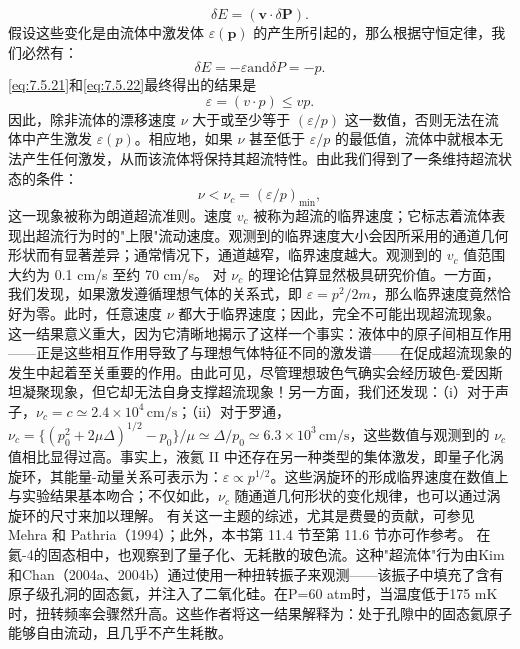 \begin{equation}\tag{7.5.37}\label{eq:7.5.37}
\delta E = ( \pmb { v } \cdot \delta \mathbf { P } ) .
\end{equation}
假设这些变化是由流体中激发体 \(\varepsilon(\boldsymbol{p})\) 的产生所引起的，那么根据守恒定律，我们必然有：
\begin{equation}\tag{7.5.38}\label{eq:7.5.38}
\delta E = - \varepsilon  \mathrm { a n d }  \delta P = - p .
\end{equation}
\autoref{eq:7.5.21}和\autoref{eq:7.5.22}最终得出的结果是
\begin{equation}\tag{7.5.39}\label{eq:7.5.39}
\varepsilon = ( v \cdot p ) \leq v p .
\end{equation}
因此，除非流体的漂移速度 \(\nu\) 大于或至少等于 \((\varepsilon/p)\) 这一数值，否则无法在流体中产生激发 \(\varepsilon(p)\)。相应地，如果 \(\nu\) 甚至低于 \(\varepsilon/p\) 的最低值，流体中就根本无法产生任何激发，从而该流体将保持其超流特性。由此我们得到了一条维持超流状态的条件：
\begin{equation}\tag{7.5.40}\label{eq:7.5.40}
\nu < \nu _ { c } = ( \varepsilon / p ) _ { \mathrm { m i n } } ,
\end{equation}
这一现象被称为朗道超流准则。速度 \(v_{c}\) 被称为超流的临界速度；它标志着流体表现出超流行为时的"上限"流动速度。观测到的临界速度大小会因所采用的通道几何形状而有显著差异；通常情况下，通道越窄，临界速度越大。观测到的 \(v_{c}\) 值范围大约为 0.1 cm/s 至约 70 cm/s。
对 \(\nu_{c}\) 的理论估算显然极具研究价值。一方面，我们发现，如果激发遵循理想气体的关系式，即 \(\varepsilon=p^{2}/2m\)，那么临界速度竟然恰好为零。此时，任意速度 \(\nu\) 都大于临界速度；因此，完全不可能出现超流现象。这一结果意义重大，因为它清晰地揭示了这样一个事实：液体中的原子间相互作用——正是这些相互作用导致了与理想气体特征不同的激发谱——在促成超流现象的发生中起着至关重要的作用。由此可见，尽管理想玻色气确实会经历玻色-爱因斯坦凝聚现象，但它却无法自身支撑超流现象！另一方面，我们还发现：（i）对于声子，\(\nu_{c}=c\simeq2.4\times10^{4}\,\mathrm{cm/s}\)；（ii）对于罗通，\(\nu_{c}=\{(p_{0}^{2}+2\mu\Delta)^{1/2}-p_{0}\}/\mu\simeq\Delta/p_{0}\simeq6.3\times10^{3}\,\mathrm{cm/s}\)，这些数值与观测到的 \(\nu_{c}\) 值相比显得过高。事实上，液氦 II 中还存在另一种类型的集体激发，即量子化涡旋环，其能量-动量关系可表示为：\(\varepsilon\propto p^{1/2}\)。这些涡旋环的形成临界速度在数值上与实验结果基本吻合；不仅如此，\(\nu_{c}\) 随通道几何形状的变化规律，也可以通过涡旋环的尺寸来加以理解。
有关这一主题的综述，尤其是费曼的贡献，可参见 Mehra 和 Pathria（1994）；此外，本书第 11.4 节至第 11.6 节亦可作参考。
在氦-4的固态相中，也观察到了量子化、无耗散的玻色流。这种"超流体"行为由Kim和Chan（2004a、2004b）通过使用一种扭转振子来观测——该振子中填充了含有原子级孔洞的固态氦，并注入了二氧化硅。在P=60 atm时，当温度低于175 mK时，扭转频率会骤然升高。这些作者将这一结果解释为：处于孔隙中的固态氦原子能够自由流动，且几乎不产生耗散。
